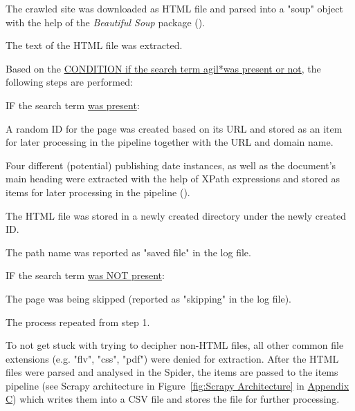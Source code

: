 \begin{compactenum}
    \setlength
    \itemsep{0em}
        \item The crawled site was downloaded as HTML file and parsed into a "soup" object with the help of the \textit{Beautiful Soup} package (\cite{Richardson2007}).
        \item The text of the HTML file was extracted.
        \item Based on the \underline{CONDITION if the search term agil*\footnotemark  was present or not}, the following steps are performed: 
        \begin{compactenum}
            \item IF the search term \underline{was present}:
            \begin{compactenum}
                \item A random ID for the page was created  based on its URL and stored as an item for later processing in the pipeline together with the URL and domain name.
                \item Four different (potential) publishing date instances, as well as the document's main heading were extracted with the help of XPath expressions and stored as items for later processing in the pipeline (\cite{W3schools.com2020}).
                \item The HTML file was stored in a newly created directory under the newly created ID.
                \item The path name was reported as "saved file" in the log file. 
            \end{compactenum}
            \item IF the search term \underline{was NOT present}:
            \begin{compactenum}
                \item The page was being skipped (reported as "skipping" in the log file).
            \end{compactenum}
        \end{compactenum}
        \item The process repeated from step 1. 
\end{compactenum}
To not get stuck with trying to decipher non-HTML files, all other common file extensions (e.g. "flv", "css", "pdf") were denied for extraction. After the HTML files were parsed and analysed in the Spider, the items are passed to the items pipeline (see Scrapy architecture in Figure~\ref{fig:Scrapy Architecture} in \hyperref[Appendix C]{Appendix C}) which writes them into a CSV file and stores the file for further processing.

